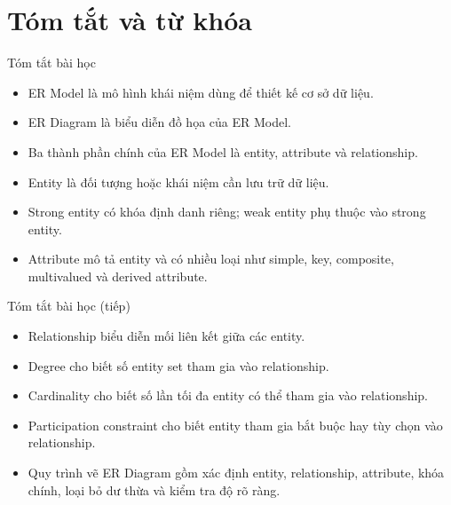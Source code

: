 \documentclass[aspectratio=169,11pt]{beamer}
\newcommand{\smallitem}{\setlength{\itemsep}{2pt}\setlength{\parskip}{0pt}}
\begin{document}
\section{Tóm tắt và từ khóa}

\begin{frame}{Tóm tắt bài học}
\small
\begin{itemize}
\smallitem
  \item ER Model là mô hình khái niệm dùng để thiết kế cơ sở dữ liệu.
  \item ER Diagram là biểu diễn đồ họa của ER Model.
  \item Ba thành phần chính của ER Model là entity, attribute và relationship.
  \item Entity là đối tượng hoặc khái niệm cần lưu trữ dữ liệu.
  \item Strong entity có khóa định danh riêng; weak entity phụ thuộc vào strong entity.
  \item Attribute mô tả entity và có nhiều loại như simple, key, composite, multivalued và derived attribute.
\end{itemize}
\end{frame}

\begin{frame}{Tóm tắt bài học (tiếp)}
\small
\begin{itemize}
\smallitem
  \item Relationship biểu diễn mối liên kết giữa các entity.
  \item Degree cho biết số entity set tham gia vào relationship.
  \item Cardinality cho biết số lần tối đa entity có thể tham gia vào relationship.
  \item Participation constraint cho biết entity tham gia bắt buộc hay tùy chọn vào relationship.
  \item Quy trình vẽ ER Diagram gồm xác định entity, relationship, attribute, khóa chính, loại bỏ dư thừa và kiểm tra độ rõ ràng.
\end{itemize}
\end{frame}
\end{document}
